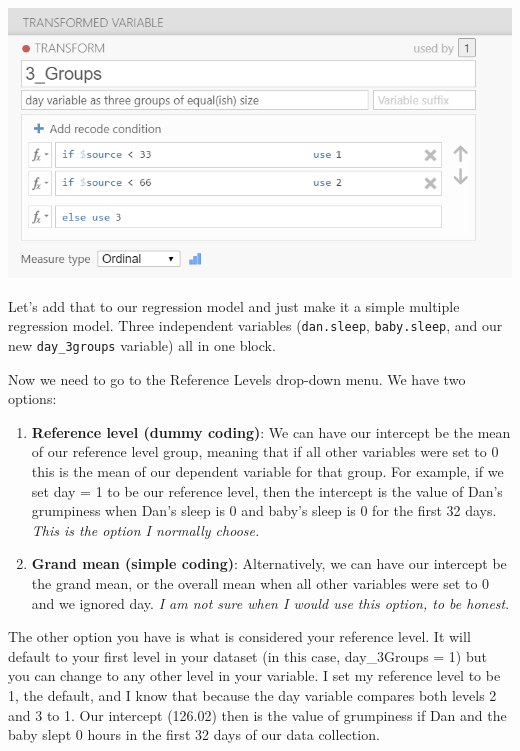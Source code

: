 \documentclass[
]{book}
\providecommand{\tightlist}{%
  \setlength{\itemsep}{0pt}\setlength{\parskip}{0pt}}
\begin{document}
\includegraphics{images/13-regression/transform.png}

Let's add that to our regression model and just make it a simple multiple regression model. Three independent variables (\texttt{dan.sleep}, \texttt{baby.sleep}, and our new \texttt{day\_3groups} variable) all in one block.

Now we need to go to the Reference Levels drop-down menu. We have two options:

\begin{enumerate}
\def\labelenumi{\arabic{enumi}.}
\tightlist
\item
  \textbf{Reference level (dummy coding)}: We can have our intercept be the mean of our reference level group, meaning that if all other variables were set to 0 this is the mean of our dependent variable for that group. For example, if we set day = 1 to be our reference level, then the intercept is the value of Dan's grumpiness when Dan's sleep is 0 and baby's sleep is 0 for the first 32 days. \emph{This is the option I normally choose.}
\item
  \textbf{Grand mean (simple coding)}: Alternatively, we can have our intercept be the grand mean, or the overall mean when all other variables were set to 0 and we ignored day. \emph{I am not sure when I would use this option, to be honest}.
\end{enumerate}

The other option you have is what is considered your reference level. It will default to your first level in your dataset (in this case, day\_3Groups = 1) but you can change to any other level in your variable. I set my reference level to be 1, the default, and I know that because the day variable compares both levels 2 and 3 to 1. Our intercept (126.02) then is the value of grumpiness if Dan and the baby slept 0 hours in the first 32 days of our data collection.
\end{document}
